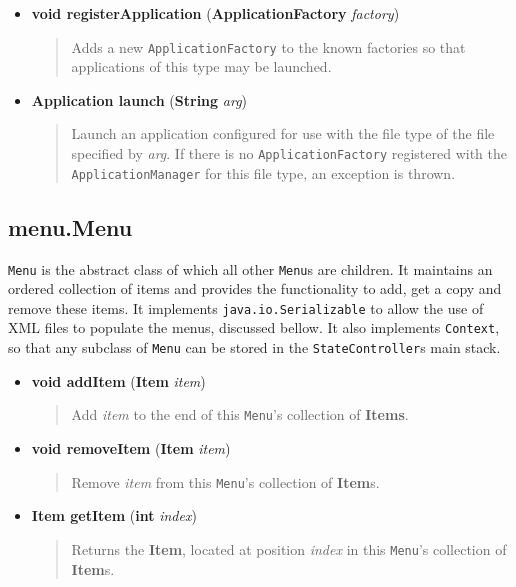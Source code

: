 \documentclass[letterpaper, titlepage, 11pt]{article}
\begin{document}
\begin{itemize}
\item[] \textbf{void registerApplication} (\textbf{ApplicationFactory} \textit{factory})
\begin{quotation}
Adds a new \texttt{ApplicationFactory} to the known factories so that
applications of this type may be launched.
\end{quotation}

\item[] \textbf{Application launch} (\textbf{String} \textit{arg})
\begin{quotation}
Launch an application configured for use with the file type of the file
specified by \textit{arg}. If there is no \texttt{ApplicationFactory} registered
with the \texttt{ApplicationManager} for this file type, an exception is thrown.
\end{quotation}
\end{itemize}

\subsection{menu.Menu}
\texttt{Menu} is the abstract class of which all other \texttt{Menu}s are
children.  It maintains an ordered collection of items and provides the
functionality to add, get a copy and remove these items.  It implements
\texttt{java.io.Serializable} to allow the use of XML files to populate the
menus, discussed bellow.  It also implements \texttt{Context}, so that any
subclass of \texttt{Menu} can be stored in the \texttt{StateController}s main
stack.

\begin{itemize}
\item[] \textbf{void addItem} (\textbf{Item} \textit{item})
\begin{quotation}
Add \textit{item} to the end of this \texttt{Menu}'s collection of
\textbf{Items}.
\end{quotation}

\item[] \textbf{void removeItem} (\textbf{Item} \textit{item})
\begin{quotation}
Remove \textit{item} from this \texttt{Menu}'s collection of \textbf{Item}s.
\end{quotation}

\item[] \textbf{Item getItem} (\textbf{int} \textit{index})
\begin{quotation}
Returns the \textbf{Item}, located at position \textit{index} in this
\texttt{Menu}'s collection of \textbf{Item}s.
\end{quotation}
\end{itemize}
\end{document}
